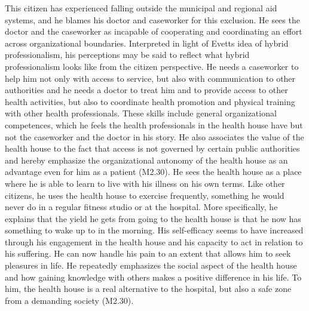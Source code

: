 \par
This citizen has experienced falling outside the municipal and regional aid systems, and he blames his doctor and caseworker for this exclusion. He sees the doctor and the caseworker as incapable of cooperating and coordinating an effort across organizational boundaries. Interpreted in light of Evetts idea of hybrid professionalism, his perceptions may be said to reflect what hybrid professionalism looks like from the citizen perspective. He needs a caseworker to help him not only with access to service, but also with communication to other authorities and he needs a doctor to treat him and to provide access to other health activities, but also to coordinate health promotion and physical training with other health professionals. These skills include general organizational competences, which he feels the health professionals in the health house have but not the caseworker and the doctor in his story. He also associates the value of the health house to the fact that access is not governed by certain public authorities and hereby emphasize the organizational autonomy of the health house as an advantage even for him as a patient (M2.30). He sees the health house as a place where he is able to learn to live with his illness on his own terms. Like other citizens, he uses the health house to exercise frequently, something he would never do in a regular fitness studio or at the hospital. More specifically, he explains that the yield he gets from going to the health house is that he now has something to wake up to in the morning. His self-efficacy seems to have increased through his engagement in the health house and his capacity to act in relation to his suffering. He can now handle his pain to an extent that allows him to seek pleasures in life. He repeatedly emphasizes the social aspect of the health house and how gaining knowledge with others makes a positive difference in his life. To him, the health house is a real alternative to the hospital, but also a safe zone from a demanding society (M2.30).

